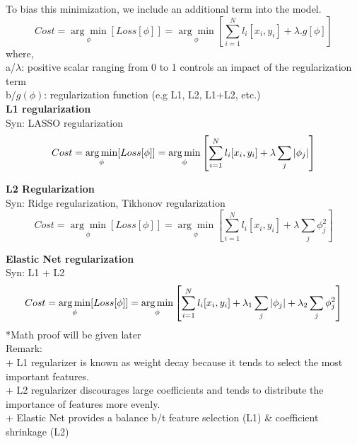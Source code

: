 \documentclass[12pt,a4paper]{article}
\begin{document}
\noindent To bias this minimization, we include an additional term into the model.
\begin{equation}
	Cost = \underset{\phi}{\arg\min}[Loss[\phi]]
	= \underset{\phi}{\arg\min}\left[\sum_{i=1}^{N}{l_{i}[x_i, y_i]+\lambda. {g[\phi]}}\right]
\end{equation}
where,\\
\indent a/$\lambda$: positive scalar ranging from 0 to 1 controls an impact of the regularization term\\
\indent b/$g(\phi)$: regularization function (e.g L1, L2, L1+L2, etc.)\\

\noindent \textbf{L1 regularization}\\
Syn: LASSO regularization
\begin{displaymath}
Cost = \underset{\phi}{\arg\min}[Loss[\phi]]
= \underset{\phi}{\arg\min}\left[\sum_{i=1}^{N}{l_{i}[x_i, y_i]+\lambda\sum_{j}^{}{\abs{\phi_j}}}\right]
\end{displaymath}

\noindent \textbf{L2 Regularization}\\
Syn: Ridge regularization, Tikhonov regularization
\begin{displaymath}
Cost = \underset{\phi}{\arg\min}[Loss[\phi]]
= \underset{\phi}{\arg\min}\left[\sum_{i=1}^{N}{l_{i}[x_i, y_i]+\lambda\sum_{j}^{}{\phi_j^{2}}}\right]
\end{displaymath}

\noindent \textbf{Elastic Net regularization}\\
Syn:  L1 + L2
\begin{displaymath}
Cost = \underset{\phi}{\arg\min}[Loss[\phi]]
= \underset{\phi}{\arg\min}\left[\sum_{i=1}^{N}{l_{i}[x_i, y_i]}+\lambda_1\sum_{j}^{}{\abs{\phi_j}}+ \lambda_2\sum_{j}^{}{\phi_j^{2}}\right]
\end{displaymath}
*Math proof will be given later\\
Remark:\\
\noindent + L1 regularizer is known as weight decay because it tends to select the most important features.\\

\noindent + L2 regularizer discourages large coefficients and tends to distribute the importance of features more evenly.\\

\noindent + Elastic Net provides a balance b/t feature selection (L1) \& coefficient shrinkage (L2)
\end{document}
